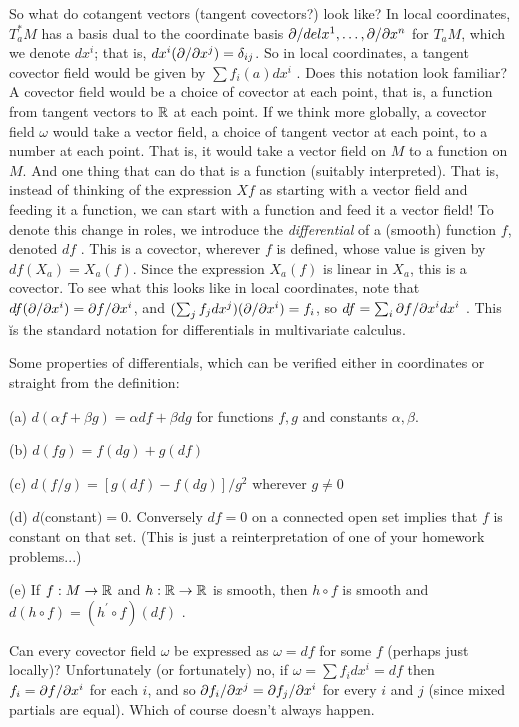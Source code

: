 So what do cotangent vectors (tangent covectors?) look like? In local coordinates, 
$T^*_aM$ has a basis dual to 
the coordinate basis $\partial/del x^1,\ldots ,\partial/\partial x^n$ for $T_aM$, which we denote
$dx^i$; that is, $dx^i(\partial/\partial x^j)=\delta_{ij}$. So in local coordinates, a tangent covector field
would be given by $\sum f_i(a) dx^i$ . Does this notation look familiar? A covector field would be
a choice of covector at each point, that is, a function from tangent vectors to ${\Bbb R}$ at each point.
If we think more globally, a covector field $\omega$ would take a vector field, a choice of tangent
vector at each point, to a number at each point. That is, it would take a vector field on $M$ to a function
on $M$. And one thing that can do that is a function (suitably interpreted). That is, instead of thinking
of the expression $Xf$ as starting with a vector field and feeding it a function, we can start with a 
function and feed it a vector field! To denote this change in roles, we introduce the {\it differential}
of a (smooth) function $f$, denoted $df$ . This is a covector, wherever $f$ is defined, whose value is 
given by $df(X_a)=X_a(f)$. Since the expression $X_a(f)$ is linear in $X_a$, this is a covector. 
To see what this looks like in local coordinates, note that $df(\partial/\partial x^i) = \partial f/\partial x^i$,
and $(\sum_j f_j dx^j)(\partial/\partial x^i)=f_i$, so $df= \sum_i\partial f/\partial x^i dx^i$ . This \u{is}
the standard notation for differentials in multivariate calculus. 

\ssk

Some properties of differentials, which can be verified either in coordinates or straight from 
the definition: 

(a) $d(\alpha f+\beta g) = \alpha df + \beta dg$ for functions $f,g$ and constants $\alpha,\beta$.

(b) $d(fg)=f(dg)+g(df)$

(c) $d(f/g) = [g(df)-f(dg)]/g^2$ wherever $g\neq 0$

(d) $d($constant$)=0$. Conversely $df=0$ on a connected open set implies that $f$ is constant on that set.
(This is just a reinterpretation of one of your homework problems...)

(e) If $f:M\rightarrow{\Bbb R}$ and $h:{\Bbb R}\rightarrow{\Bbb R}$ is smooth, 
then $h\circ f$ is smooth and $d(h\circ f)=(h^\prime\circ f)(df)$ .

\ssk

Can every covector field $\omega$ be expressed as $\omega = df$ for some $f$ (perhaps just locally)?
Unfortunately (or fortunately) no, if $\omega = \sum f_i dx^i = df$ then $f_i=\partial f/\partial x^i$
for each $i$, and so $\partial f_i/\partial x^j = \partial f_j/\partial x^i$ for every $i$ and $j$ (since mixed
partials are equal). Which of course doesn't always happen.

